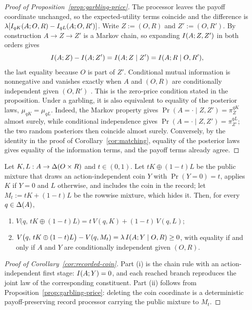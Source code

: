 \begin{proof}[Proof of Proposition~\ref{prop:garbling-price}]
The processor leaves the payoff coordinate unchanged, so the expected-utility terms coincide and the difference is
$\lambda[I_{qK}(A;O,R)-I_{qL}(A;O,R')]$.  Write $Z:=(O,R)$ and $Z':=(O,R')$.  By construction $A\to Z\to Z'$ is
a Markov chain, so expanding $I(A;Z,Z')$ in both orders gives
\[
 I(A;Z)-I(A;Z')=I(A;Z\mid Z')=I(A;R\mid O,R'),
\]
the last equality because $O$ is part of $Z'$.  Conditional mutual information is nonnegative and vanishes exactly
when $A$ and $(O,R)$ are conditionally independent given $(O,R')$ \cite{CoverThomas2006}.  This is the zero-price
condition stated in the proposition.  Under a garbling, it is also equivalent to equality of the posterior laws,
$\mu_{qK}=\mu_{qL}$.  Indeed, the Markov property gives
$\Pr(A=\cdot\mid Z,Z')=\pi^{qK}_{Z}$ almost surely, while conditional independence gives
$\Pr(A=\cdot\mid Z,Z')=\pi^{qL}_{Z'}$; the two random posteriors then coincide almost surely.  Conversely, by the
identity in the proof of Corollary~\ref{cor:matching}, equality of the posterior laws gives equality of the
information terms, and the payoff terms already agree.
\end{proof}

\begin{corollary}\label{cor:recorded-coin}
Let $K,L:A\to\Delta(O\times R)$ and $t\in(0,1)$.  Let $tK\oplus(1-t)L$ be the public mixture that draws an
action-independent coin $Y$ with $\Pr(Y=0)=t$, applies $K$ if $Y=0$ and $L$ otherwise, and includes the coin in
the record; let $M_t:=tK+(1-t)L$ be the rowwise mixture, which hides it.  Then, for every $q\in\Delta(A)$,
\begin{enumerate}[label=\textup{(\roman*)},leftmargin=*]
\item $V\bigl(q,\,tK\oplus(1-t)L\bigr)=t\,V(q,K)+(1-t)\,V(q,L)$;
\item $V\bigl(q,\,tK\oplus(1-t)L\bigr)-V(q,M_t)=\lambda\,I(A;Y\mid O,R)\ge0$, with equality if and only if $A$
and $Y$ are conditionally independent given $(O,R)$.
\end{enumerate}
\end{corollary}

\begin{proof}[Proof of Corollary~\ref{cor:recorded-coin}]
Part \textup{(i)} is the chain rule with an action-independent first stage:
$I(A;Y)=0$, and each reached branch reproduces the joint law of the
corresponding constituent.  Part \textup{(ii)} follows from
Proposition~\ref{prop:garbling-price}: deleting the coin coordinate is a
deterministic payoff-preserving record processor carrying the public mixture
to $M_t$.
\end{proof}


